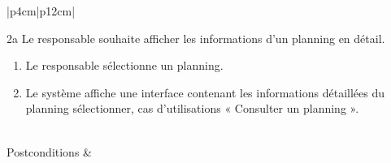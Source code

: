 \begin{longtable}{|p{4cm}|p{12cm}|}
\begin{minipage}[t]{\linewidth}
\begin{enumerate}[nosep,after=\strut, ]
                            \end{enumerate}
                            2a Le responsable souhaite afficher les informations d’un planning en détail.
                            \begin{enumerate}[nosep,after=\strut, ]
                                \item Le responsable sélectionne un planning. 
                                \item Le système affiche une interface contenant les informations détaillées du planning sélectionner, cas d’utilisations « Consulter un planning ».
                            \end{enumerate}
                    \end{minipage}
                    \\
                    
                    \hline
                    Postconditions &
                    \\
                    \hline
                    \caption{Description du cas d'utilisation « Consulter liste des plannings »}\\
            \end{longtable}
        
